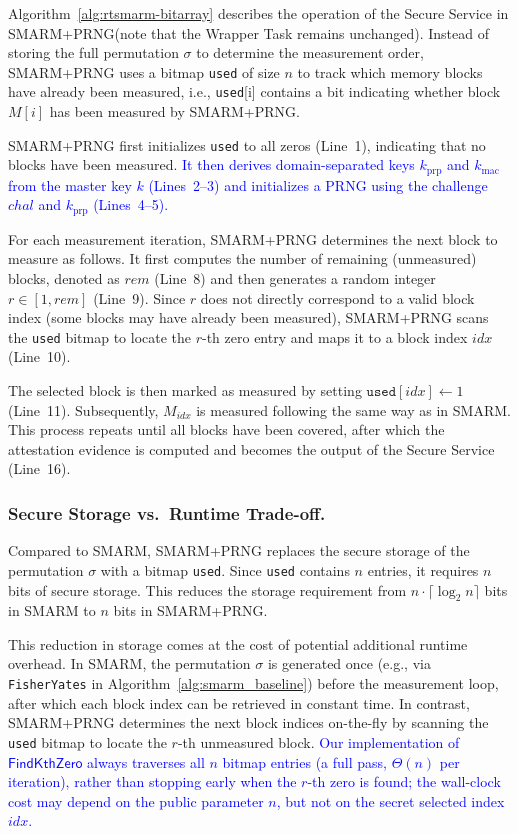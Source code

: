 \documentclass[journal]{IEEEtran}
\newcommand\ben[1]{\textcolor{blue}{#1}}
\newcommand{\rtsmarmone}{SMARM+PRNG\xspace}
\begin{document}
Algorithm~\ref{alg:rtsmarm-bitarray} describes the operation of the Secure Service in \rtsmarmone (note that the Wrapper Task remains unchanged).
Instead of storing the full permutation $\sigma$ to determine the measurement order, \rtsmarmone uses a bitmap \texttt{used} of size $n$ to track which memory blocks have already been measured, i.e., \texttt{used}[i] contains a bit indicating whether block $M[i]$ has been measured by \rtsmarmone.

\rtsmarmone first initializes \texttt{used} to all zeros (Line~1), indicating that no blocks have been measured.
\ben{It then derives domain-separated keys $k_{\mathrm{prp}}$ and $k_{\mathrm{mac}}$ from the master key $k$ (Lines~2--3) and initializes a PRNG using the challenge $chal$ and $k_{\mathrm{prp}}$ (Lines~4--5).}

For each measurement iteration, \rtsmarmone determines the next block to measure as follows.
It first computes the number of remaining (unmeasured) blocks, denoted as $rem$ (Line~8) and then generates a random integer $r \in [1, rem]$ (Line~9).
Since $r$ does not directly correspond to a valid block index (some blocks may have already been measured), \rtsmarmone scans the \texttt{used} bitmap to locate the $r$-th zero entry and maps it to a block index $idx$ (Line~10).

The selected block is then marked as measured by setting $\texttt{used}[idx] \leftarrow 1$ (Line~11).
Subsequently, $M_{idx}$ is measured following the same way as in SMARM.
This process repeats until all blocks have been covered, after which the attestation evidence is computed and becomes the output of the Secure Service (Line~16).


\subsubsection{Secure Storage vs.\ Runtime Trade-off.}
Compared to SMARM, \rtsmarmone replaces the secure storage of the permutation $\sigma$ with a bitmap \texttt{used}.
Since \texttt{used} contains $n$ entries, it requires $n$ bits of secure storage.
This reduces the storage requirement from $n \cdot \lceil \log_2 n \rceil$ bits in SMARM to $n$ bits in \rtsmarmone.

This reduction in storage comes at the cost of potential additional runtime overhead.
In SMARM, the permutation $\sigma$ is generated once (e.g., via \texttt{FisherYates} in Algorithm~\ref{alg:smarm_baseline}) before the measurement loop, after which each block index can be retrieved in constant time.
In contrast, \rtsmarmone determines the next block indices on-the-fly by scanning the \texttt{used} bitmap to locate the $r$-th unmeasured block.
\ben{Our implementation of $\mathsf{FindKthZero}$ always traverses all $n$ bitmap entries (a full pass, $\Theta(n)$ per iteration), rather than stopping early when the $r$-th zero is found; the wall-clock cost may depend on the public parameter $n$, but not on the secret selected index $idx$.}
\end{document}
